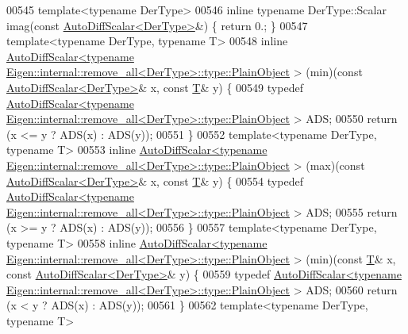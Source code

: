 \begin{DoxyCode}
00545 \textcolor{keyword}{template}<\textcolor{keyword}{typename} DerType>
00546 \textcolor{keyword}{inline} \textcolor{keyword}{typename} DerType::Scalar imag(\textcolor{keyword}{const} \hyperlink{class_eigen_1_1_auto_diff_scalar}{AutoDiffScalar<DerType>}&)    \{ \textcolor{keywordflow}{return} 0.;
       \}
00547 \textcolor{keyword}{template}<\textcolor{keyword}{typename} DerType, \textcolor{keyword}{typename} T>
00548 \textcolor{keyword}{inline} 
      \hyperlink{class_eigen_1_1_auto_diff_scalar}{AutoDiffScalar<typename Eigen::internal::remove\_all<DerType>::type::PlainObject}
      > (min)(\textcolor{keyword}{const} \hyperlink{class_eigen_1_1_auto_diff_scalar}{AutoDiffScalar<DerType>}& x, \textcolor{keyword}{const} \hyperlink{group___sparse_core___module}{T}& y) \{
00549   \textcolor{keyword}{typedef} 
      \hyperlink{class_eigen_1_1_auto_diff_scalar}{AutoDiffScalar<typename Eigen::internal::remove\_all<DerType>::type::PlainObject}
      > ADS;
00550   \textcolor{keywordflow}{return} (x <= y ? ADS(x) : ADS(y));
00551 \}
00552 \textcolor{keyword}{template}<\textcolor{keyword}{typename} DerType, \textcolor{keyword}{typename} T>
00553 \textcolor{keyword}{inline} 
      \hyperlink{class_eigen_1_1_auto_diff_scalar}{AutoDiffScalar<typename Eigen::internal::remove\_all<DerType>::type::PlainObject}
      > (max)(\textcolor{keyword}{const} \hyperlink{class_eigen_1_1_auto_diff_scalar}{AutoDiffScalar<DerType>}& x, \textcolor{keyword}{const} \hyperlink{group___sparse_core___module}{T}& y) \{
00554   \textcolor{keyword}{typedef} 
      \hyperlink{class_eigen_1_1_auto_diff_scalar}{AutoDiffScalar<typename Eigen::internal::remove\_all<DerType>::type::PlainObject}
      > ADS;
00555   \textcolor{keywordflow}{return} (x >= y ? ADS(x) : ADS(y));
00556 \}
00557 \textcolor{keyword}{template}<\textcolor{keyword}{typename} DerType, \textcolor{keyword}{typename} T>
00558 \textcolor{keyword}{inline} 
      \hyperlink{class_eigen_1_1_auto_diff_scalar}{AutoDiffScalar<typename Eigen::internal::remove\_all<DerType>::type::PlainObject}
      > (min)(\textcolor{keyword}{const} \hyperlink{group___sparse_core___module}{T}& x, \textcolor{keyword}{const} \hyperlink{class_eigen_1_1_auto_diff_scalar}{AutoDiffScalar<DerType>}& y) \{
00559   \textcolor{keyword}{typedef} 
      \hyperlink{class_eigen_1_1_auto_diff_scalar}{AutoDiffScalar<typename Eigen::internal::remove\_all<DerType>::type::PlainObject}
      > ADS;
00560   \textcolor{keywordflow}{return} (x < y ? ADS(x) : ADS(y));
00561 \}
00562 \textcolor{keyword}{template}<\textcolor{keyword}{typename} DerType, \textcolor{keyword}{typename} T>

\end{DoxyCode}
